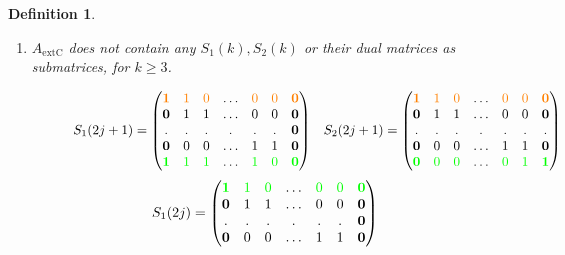 \documentclass[a4paper,10pt]{report}
\theoremstyle{plain}
\theoremstyle{remark}
\theoremstyle{plain}
\newtheorem{defn}{Definition}[chapter]
\newcommand*{\extC}{\mathrm{extC}}
\begin{document}
\begin{defn}
\begin{enumerate}
		\item $A_{\extC}$ does not contain any $S_1(k), S_2(k)$ or their dual matrices as submatrices, for $k \geq 3$. \label{itm:4_def_adm}
	
	\begin{figure}[h!]
	\centering
			\begin{align*}
			S_1(2j+1) &= \begin{pmatrix}
				\textcolor{orange}{\textbf 1} & \textcolor{orange}{1} & \textcolor{orange}{0} & \ldots & \textcolor{orange}{0} & \textcolor{orange}{0} & \textcolor{orange}{\textbf 0} \\
				\textbf 0 & 1& 1 & \ldots & 0 & 0 & \textbf 0\\
				. & . & . & . & . & . & \textbf 0 \\
				\textbf 0 &0 &0 & \ldots & 1 & 1 & \textbf 0\\
				\textcolor{green}{\textbf 1} & \textcolor{green}{1} & \textcolor{green}{1} & \ldots & \textcolor{green}{1} & \textcolor{green}{0 } &  \textcolor{green}{\textbf 0} \\
			\end{pmatrix}
			&
			S_2(2j+1) &= \begin{pmatrix}
				\textcolor{orange}{\textbf 1} & \textcolor{orange}{1} & \textcolor{orange}{0} & \ldots & \textcolor{orange}{0} & \textcolor{orange}{0} & \textcolor{orange}{\textbf 0} \\
				\textbf 0 & 1& 1 & \ldots & 0 & 0 & \textbf 0 \\
				. & . & . & . & . & . & .\\
				\textbf 0 &0 &0 & \ldots & 1 & 1 & \textbf 0 \\
				\textcolor{green}{\textbf 0} & \textcolor{green}{0} & \textcolor{green}{0} & \ldots & \textcolor{green}{0} & \textcolor{green}{1} & \textcolor{green}{\textbf 1}\\
			\end{pmatrix}
		\end{align*}
		\begin{align*}
			S_1(2j) &= \begin{pmatrix}
				\textcolor{green}{\textbf 1} & \textcolor{green}{1} & \textcolor{green}{0} & \ldots & \textcolor{green}{0} & \textcolor{green}{0} & \textcolor{green}{\textbf 0} \\
				\textbf 0 & 1& 1 & \ldots & 0 & 0 & \textbf 0 \\
				. & . & . & . & . & . & \textbf 0\\
				\textbf 0 &0 &0 & \ldots & 1 & 1 & \textbf 0\\

\end{pmatrix}
\end{align*}
\end{figure}
\end{enumerate}
\end{defn}
\end{document}
